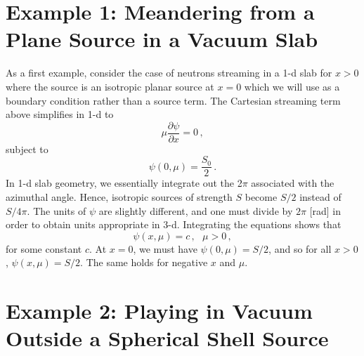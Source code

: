 \section*{Example 1: Meandering from a Plane Source in a Vacuum Slab}

As a first example, consider the case of neutrons streaming in a 1-d slab for $x>0$ where the source is an isotropic planar source at $x=0$ which we will use as a boundary condition rather than a source term. The Cartesian streaming term above simplifies in 1-d to
\begin{equation}
 \mu \frac{\partial \psi}{\partial x} = 0 \, ,
\end{equation}
subject to
\begin{equation}
 \psi(0,\mu) = \frac{S_0}{2} \, .
\end{equation}
In 1-d slab geometry, we essentially integrate out the 2$\pi$ associated with the azimuthal angle.  Hence, isotropic sources of strength $S$ become $S/2$ instead of $S/4\pi$.  The units of $\psi$ are slightly different, and one must divide by $2\pi$ [rad] in order to obtain units appropriate in 3-d.  Integrating the equations shows that
\begin{equation}
 \psi(x,\mu) = c \, , \, \, \, \, \mu > 0 \, ,
\end{equation}
for some constant $c$.  At $x = 0$, we must have $\psi(0,\mu) = S/2$, and so for all $x > 0$, $\psi(x,\mu) = S/2$.  The same holds for negative $x$ and $\mu$.

\section*{Example 2: Playing in Vacuum Outside a Spherical Shell Source}

